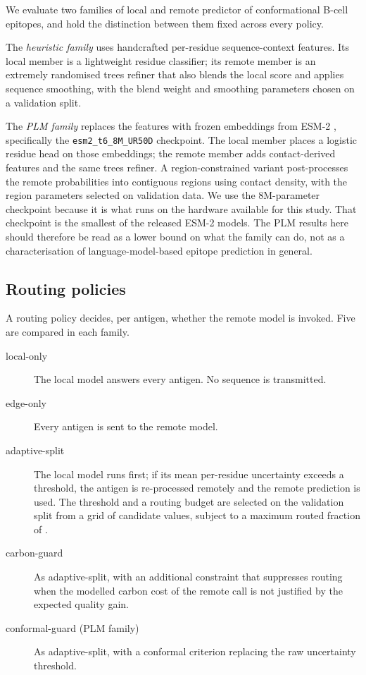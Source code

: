 We evaluate two families of local and remote predictor of conformational B-cell
epitopes, and hold the distinction between them fixed across every policy.

The \emph{heuristic family} uses handcrafted per-residue sequence-context
features. Its local member is a lightweight residue classifier; its remote
member is an extremely randomised trees refiner that also blends the
local score and applies sequence smoothing, with the blend weight and smoothing
parameters chosen on a validation split.

The \emph{PLM family} replaces the features with frozen embeddings from ESM-2
\citep{lin2023esm}, specifically the \texttt{esm2\_t6\_8M\_UR50D}
checkpoint. The local member places a logistic residue head on those embeddings;
the remote member adds contact-derived features and the same trees refiner.
A region-constrained variant post-processes the remote probabilities into
contiguous regions using contact density, with the region parameters selected on
validation data. We use the 8M-parameter checkpoint because it is what runs on
the hardware available for this study. That checkpoint is the smallest of the released
ESM-2 models. The PLM results here should therefore be read as a lower bound on what
the family can do, not as a characterisation of language-model-based epitope
prediction in general.

\subsection{Routing policies}
\label{sec:policies}

A routing policy decides, per antigen, whether the remote model is invoked.
Five are compared in each family.

\begin{description}
  \item[local-only] The local model answers every antigen. No sequence is
  transmitted.
  \item[edge-only] Every antigen is sent to the remote model.
  \item[adaptive-split] The local model runs first; if its mean per-residue
  uncertainty exceeds a threshold, the antigen is re-processed remotely and the
  remote prediction is used. The threshold and a routing budget are selected on
  the validation split from a grid of \ThresholdGridSize{} candidate values,
  subject to a maximum routed fraction of \RouteBudgetMax{}.
  \item[carbon-guard] As adaptive-split, with an additional constraint that
  suppresses routing when the modelled carbon cost of the remote call is not
  justified by the expected quality gain.
  \item[conformal-guard (PLM family)] As adaptive-split, with a conformal
  criterion \citep{angelopoulos2021gentle} replacing the raw uncertainty
  threshold.
\end{description}

